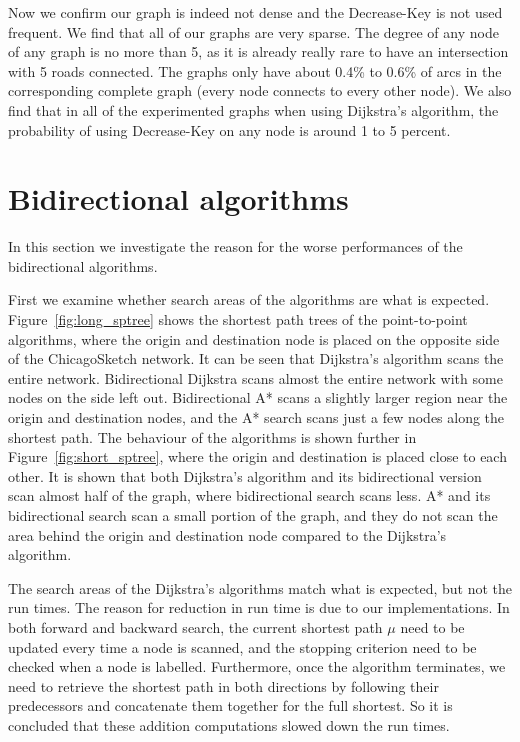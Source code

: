Now we confirm our graph is indeed not dense and the Decrease-Key is not used frequent.
We find that all of our graphs are very sparse.
The degree of any node of any graph is no more than 5,
as it is already really rare to have an intersection with 5 roads connected.
The graphs only have about 0.4\% to 0.6\% of arcs in the corresponding complete graph (every node connects to every other node).
We also find that in all of the experimented graphs when using Dijkstra's algorithm,
the probability of using Decrease-Key on any node is around 1 to 5 percent.

\section{Bidirectional algorithms}
In this section we investigate the reason for the worse performances of the bidirectional algorithms. 

First we examine whether search areas of the algorithms are what is expected.
Figure~\ref{fig:long_sptree} shows the shortest path trees of the point-to-point algorithms, where the origin and destination node is placed on the opposite side of the ChicagoSketch network.
It can be seen that Dijkstra's algorithm scans the entire network.
Bidirectional Dijkstra scans almost the entire network with some nodes on the side left out.
Bidirectional A* scans a slightly larger region near the origin and destination nodes,
and the A* search scans just a few nodes along the shortest path.
The behaviour of the algorithms is shown further in Figure~\ref{fig:short_sptree},
where the origin and destination is placed close to each other.
It is shown that both Dijkstra's algorithm and its bidirectional version scan almost half of the graph,
where bidirectional search scans less.
A* and its bidirectional search scan a small portion of the graph,
and they do not scan the area behind the origin and destination node compared to the Dijkstra's algorithm.

The search areas of the Dijkstra's algorithms match what is expected,
but not the run times.
The reason for reduction in run time is due to our implementations.
In both forward and backward search,
the current shortest path $\mu$ need to be updated every time a node is scanned,
and the stopping criterion need to be checked when a node is labelled.
Furthermore,
once the algorithm terminates,
we need to retrieve the shortest path in both directions by following their predecessors and concatenate them together for the full shortest.
So it is concluded that these addition computations slowed down the run times.

